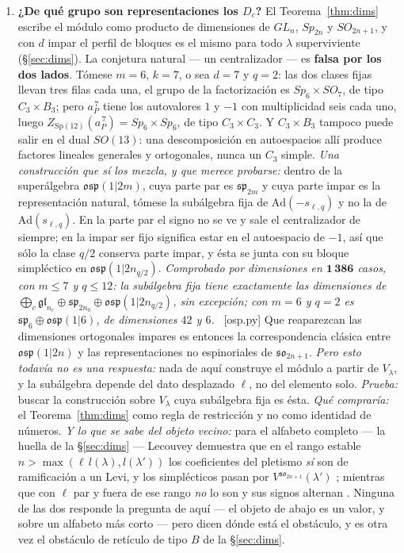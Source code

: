 \documentclass[11pt,a4paper]{article}
\newcommand{\Sp}{\mathrm{Sp}}
\newcommand{\ver}[1]{\unskip\penalty0\ \textcolor{azul}{\small\textsf{[#1]}}}
\begin{document}
\begin{enumerate}
\item \textbf{¿De qué grupo son representaciones los $D_c$?}
El Teorema~\ref{thm:dims} escribe el módulo como producto de dimensiones de $GL_n$, $Sp_{2n}$ y
$SO_{2n+1}$, y con $d$ impar el perfil de bloques es el mismo para todo $\lambda$ superviviente
(\S\ref{sec:dims}). La conjetura natural --- un centralizador --- es \textbf{falsa por los dos
lados}. Tómese $m=6$, $k=7$, o sea $d=7$ y $q=2$: las dos clases fijas llevan tres filas cada una, el
grupo de la factorización es $Sp_6\times SO_7$, de tipo $C_3\times B_3$; pero $a_P^{\,7}$ tiene los
autovalores $1$ y $-1$ con multiplicidad seis cada uno, luego
$Z_{\Sp(12)}(a_P^{\,7})=Sp_6\times Sp_6$, de tipo $C_3\times C_3$. Y $C_3\times B_3$ tampoco puede
salir en el dual $SO(13)$: una descomposición en autoespacios allí produce factores lineales
generales y ortogonales, nunca un $C_3$ simple.
\emph{Una construcción que sí los mezcla, y que merece probarse:} dentro de la superálgebra
$\mathfrak{osp}(1|2m)$, cuya parte par es $\mathfrak{sp}_{2m}$ y cuya parte impar es la
representación natural, tómese la subálgebra fija de $\mathrm{Ad}(-s_{\ell,q})$ y no la de
$\mathrm{Ad}(s_{\ell,q})$. En la parte par el signo no se ve y sale el centralizador de siempre;
en la impar ser fijo significa estar en el autoespacio de $-1$, así que sólo la clase $q/2$
conserva parte impar, y ésta se junta con su bloque simpléctico en
$\mathfrak{osp}(1|2n_{q/2})$. \emph{Comprobado por dimensiones en $\mathbf{1\,386}$ casos, con
$m\le7$ y $q\le12$: la subálgebra fija tiene exactamente las dimensiones de
$\bigoplus_c\mathfrak{gl}_{n_c}\oplus\mathfrak{sp}_{2n_0}\oplus\mathfrak{osp}(1|2n_{q/2})$, sin
excepción; con $m=6$ y $q=2$ es $\mathfrak{sp}_6\oplus\mathfrak{osp}(1|6)$, de dimensiones $42$ y
$6$.} \ver{osp.py} Que reaparezcan las dimensiones ortogonales impares es entonces la
correspondencia clásica entre $\mathfrak{osp}(1|2n)$ y las representaciones no espinoriales de
$\mathfrak{so}_{2n+1}$. \emph{Pero esto todavía no es una respuesta:} nada de aquí construye el
módulo a partir de $V_\lambda$, y la subálgebra depende del dato desplazado $\ell$, no del
elemento solo.
\emph{Prueba:} buscar la construcción sobre $V_\lambda$ cuya subálgebra fija es ésta. \emph{Qué compraría:} el Teorema~\ref{thm:dims} como regla de restricción y no como identidad de
números.
\emph{Y lo que se sabe del objeto vecino:} para el alfabeto completo --- la huella de la
\S\ref{sec:dims} --- Lecouvey demuestra que en el
rango estable $n>\max(\ell\,l(\lambda),l(\lambda'))$ los coeficientes del pletismo \emph{sí} son de
ramificación a un Levi, y los simplécticos pasan por $V^{\mathfrak{so}_{2n+1}}(\lambda')$
\cite[Teor.~4.5.1]{Lec07b}; mientras que con $\ell$ par y fuera de ese rango \emph{no} lo son y sus
signos alternan \cite[Prop.~3.2.5]{Lec07a}. Ninguna de las dos responde la pregunta de aquí --- el
objeto de abajo es un valor, y sobre un alfabeto más corto --- pero dicen dónde está el obstáculo,
y es otra vez el obstáculo de retículo de tipo $B$ de la \S\ref{sec:dims}.


\end{enumerate}
\end{document}
